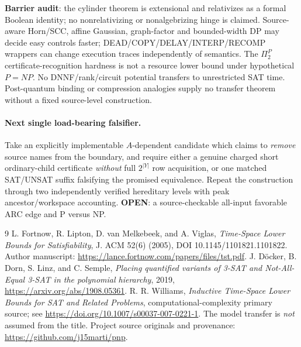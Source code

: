\documentclass[11pt]{article}
\begin{document}
\textbf{Barrier audit}: the cylinder theorem is extensional and
relativizes as a formal Boolean identity; no nonrelativizing or
nonalgebrizing hinge is claimed. Source-aware Horn/SCC,
affine Gaussian, graph-factor and bounded-width DP may
decide easy controls faster; DEAD/COPY/DELAY/INTERP/RECOMP
wrappers can change execution traces independently of
semantics. The \(\Pi_2^P\) certificate-recognition hardness
is not a resource lower bound under hypothetical \(P=NP\).
No DNNF/rank/circuit potential transfers to unrestricted
SAT time. Post-quantum binding or compression analogies
supply no transfer theorem without a fixed source-level
construction.

\paragraph{Next single load-bearing falsifier.}
Take an explicitly implementable \(A\)-dependent candidate
which claims to \emph{remove} source names from the boundary,
and require either a genuine charged short ordinary-child
certificate \emph{without} full \(2^{|Y|}\) row acquisition,
or one matched SAT/UNSAT suffix falsifying the promised
equivalence. Repeat the construction through two independently
verified hereditary levels with peak ancestor/workspace
accounting. \textbf{OPEN}: a source-checkable all-input
favorable ARC edge and P versus NP.

\begin{thebibliography}{9}
L. Fortnow, R. Lipton, D. van Melkebeek, and A. Viglas,
\emph{Time-Space Lower Bounds for Satisfiability},
J. ACM 52(6) (2005), DOI 10.1145/1101821.1101822.
Author manuscript: \url{https://lance.fortnow.com/papers/files/tst.pdf}.
J. D\"ocker, B. Dorn, S. Linz, and C. Semple,
\emph{Placing quantified variants of 3-SAT and
Not-All-Equal 3-SAT in the polynomial hierarchy}, 2019,
\url{https://arxiv.org/abs/1908.05361}.
R. R. Williams,
\emph{Inductive Time-Space Lower Bounds for SAT and
Related Problems}, computational-complexity primary source;
see \url{https://doi.org/10.1007/s00037-007-0221-1}.
The model transfer is \emph{not} assumed from the title.
Project source originals and provenance:
\url{https://github.com/j15marti/pnp}.
\end{thebibliography}
\end{document}
